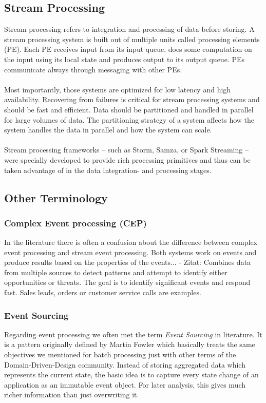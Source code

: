 \subsection{Stream Processing}
\label{intro-datastream-streamprocessing}
Stream processing refers to integration and processing of data before storing. 
A stream processing system is built out of multiple units called processing
elements (PE). Each PE receives input from its input queue, does some
computation on the input using its local state and produces output to its
output queue. PEs communicate always through messaging with other PEs. 
\\ \\
Most importantly, those systems are optimized for low latency and high
availability. Recovering from failures is critical for stream processing
systems and should be fast and efficient. 
Data should be partitioned and handled in parallel for large volumes of data. 
The partitioning strategy of a system  affects how the system
handles the data in parallel and how the system can scale. 
\cite{PrpSvyOfDSPS}
\\ \\
Stream processing frameworks -- such as Storm, Samza, or Spark
Streaming -- were specially developed to provide rich processing primitives and
thus can be taken advantage of in the data integration- and processing stages.

\subsection{Other Terminology}
\subsubsection{Complex Event processing (CEP)}
In the literature there is often a confusion about the difference between
complex event processing and stream event processing. Both systems work on
events and produce results based on the properties of the events... 
- Zitat: Combines data from multiple sources  to detect patterns and attempt to
identify either opportunities or threats. The goal is to identify significant
events and respond fast. Sales leads, orders or customer service calls are
examples.\\


\subsubsection{Event Sourcing}
\label{event-sourcing}
Regarding event processing we often met the term \textit{Event Sourcing} in
literature. It is a pattern originally defined by Martin Fowler which basically
treats the same objectives we mentioned for batch processing just with
other terms of the Domain-Driven-Design community. Instead of storing aggregated
data which represents the current state, the basic idea is to capture
every state change of an application as an immutable event object. For later
analysis, this gives much richer information than just overwriting it. 

